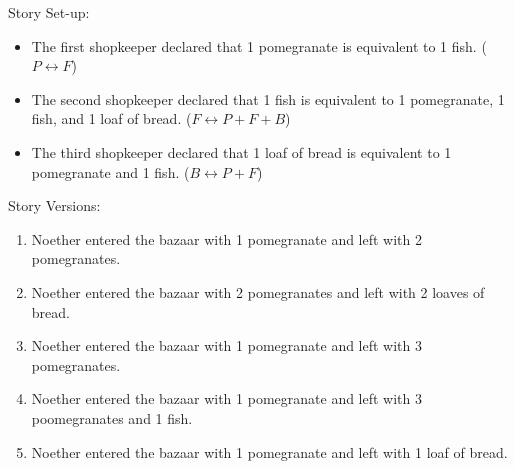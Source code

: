 Story Set-up:
\begin{itemize}
\item The first shopkeeper declared that 1 pomegranate is equivalent to 1 fish. (\(P \leftrightarrow F\))
\item The second shopkeeper declared that 1 fish is equivalent to 1 pomegranate, 1 fish, and 1 loaf of bread. (\(F \leftrightarrow P + F + B\))
\item The third shopkeeper declared that 1 loaf of bread is equivalent to 1 pomegranate and 1 fish. (\(B \leftrightarrow P + F\))
\end{itemize}

Story Versions:
\begin{enumerate}
\item Noether entered the bazaar with 1 pomegranate and left with 2 pomegranates.
\item Noether entered the bazaar with 2 pomegranates and left with 2 loaves of bread.
\item Noether entered the bazaar with 1 pomegranate and left with 3 pomegranates.
\item Noether entered the bazaar with 1 pomegranate and left with 3 poomegranates and 1 fish.
\item Noether entered the bazaar with 1 pomegranate and left with 1 loaf of bread.
\end{enumerate}
